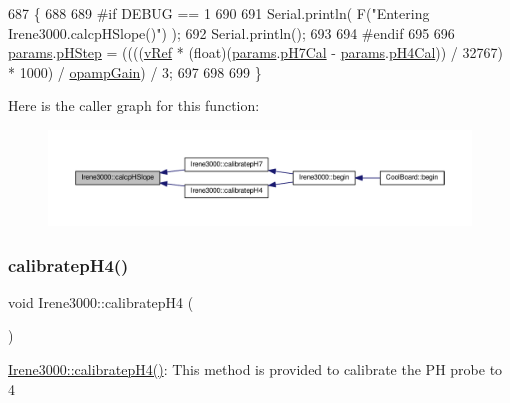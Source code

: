 \begin{DoxyCode}
687 \{
688 
689 \textcolor{preprocessor}{#if DEBUG == 1 }
690 
691     Serial.println( F(\textcolor{stringliteral}{"Entering Irene3000.calcpHSlope()"}) );
692     Serial.println();
693 
694 \textcolor{preprocessor}{#endif }
695 
696     \hyperlink{class_irene3000_a136585a5ee7f9ac6ab52175fa153f8e3}{params}.\hyperlink{struct_irene3000_1_1parameters___t_a61cfcc2539d5f630e9071f3753aba9fe}{pHStep} = ((((\hyperlink{class_irene3000_a018e7ff9bee57e6d2b298667a668ba7e}{vRef} * (float)(\hyperlink{class_irene3000_a136585a5ee7f9ac6ab52175fa153f8e3}{params}.\hyperlink{struct_irene3000_1_1parameters___t_a21265466a570d84bff914f26d2f7a03e}{pH7Cal} - 
      \hyperlink{class_irene3000_a136585a5ee7f9ac6ab52175fa153f8e3}{params}.\hyperlink{struct_irene3000_1_1parameters___t_a1144de6fb54eb3e1dd2a3d8c2afc97dc}{pH4Cal})) / 32767) * 1000) / \hyperlink{class_irene3000_a4e588985ca74e5076029d5dee81034f2}{opampGain}) / 3;
697 
698  
699 \}
\end{DoxyCode}
Here is the caller graph for this function\+:\nopagebreak
\begin{figure}[H]
\begin{center}
\leavevmode
\includegraphics[width=350pt]{d6/d03/class_irene3000_a81f6a79e546679692053f7ac1af49613_icgraph}
\end{center}
\end{figure}
\mbox{\label{class_irene3000_aa140dd026922a04981edfd04d46cabbe}} 
\subsubsection{\texorpdfstring{calibratep\+H4()}{calibratepH4()}}
{\footnotesize\ttfamily void Irene3000\+::calibratep\+H4 (\begin{DoxyParamCaption}{ }\end{DoxyParamCaption})}

\hyperlink{class_irene3000_aa140dd026922a04981edfd04d46cabbe}{Irene3000\+::calibratep\+H4()}\+: This method is provided to calibrate the PH probe to 4 

